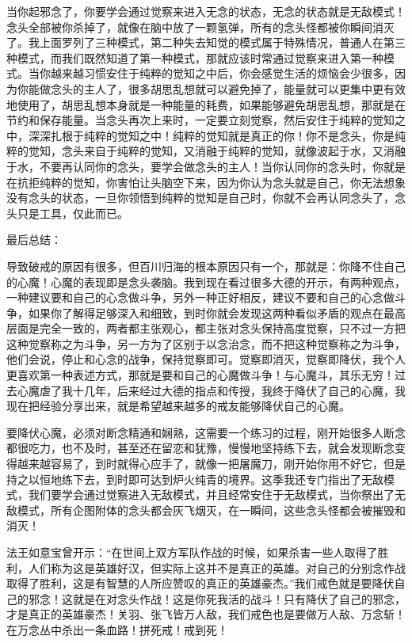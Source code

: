 当你起邪念了，你要学会通过觉察来进入无念的状态，无念的状态就是无敌模式！念头全部被你杀掉了，就像在脑中放了一颗氢弹，所有的念头怪都被你瞬间消灭了。我上面罗列了三种模式，第二种失去知觉的模式属于特殊情况，普通人在第三种模式，而我们既然知道了第一种模式，那就应该时常通过觉察来进入第一种模式。当你越来越习惯安住于纯粹的觉知之中后，你会感觉生活的烦恼会少很多，因为你能做念头的主人了，很多胡思乱想就可以避免掉了，能量就可以更集中更有效地使用了，胡思乱想本身就是一种能量的耗费，如果能够避免胡思乱想，那就是在节约和保存能量。当念头再次上来时，一定要立刻觉察，然后安住于纯粹的觉知之中，深深扎根于纯粹的觉知之中！纯粹的觉知就是真正的你！你不是念头，你是纯粹的觉知，念头来自于纯粹的觉知，又消融于纯粹的觉知，就像波起于水，又消融于水，不要再认同你的念头，要学会做念头的主人！当你认同你的念头时，你就是在抗拒纯粹的觉知，你害怕让头脑空下来，因为你认为念头就是自己，你无法想象没有念头的状态，一旦你领悟到纯粹的觉知是自己时，你就不会再认同念头了，念头只是工具，仅此而已。

最后总结：

导致破戒的原因有很多，但百川归海的根本原因只有一个，那就是：你降不住自己的心魔！心魔的表现即是念头袭脑。我到现在看过很多大德的开示，有两种观点，一种建议要和自己的心念做斗争，另外一种正好相反，建议不要和自己的心念做斗争，如果你了解得足够深入和细致，到时你就会发现这两种看似矛盾的观点在最高层面是完全一致的，两者都主张观心，都主张对念头保持高度觉察，只不过一方把这种觉察称之为斗争，另一方为了区别于以念治念，而不把这种觉察称之为斗争，他们会说，停止和心念的战争，保持觉察即可。觉察即消灭，觉察即降伏，我个人更喜欢第一种表述方式，那就是要和自己的心魔做斗争！与心魔斗，其乐无穷！过去心魔虐了我十几年，后来经过大德的指点和传授，我终于降伏了自己的心魔，我现在把经验分享出来，就是希望越来越多的戒友能够降伏自己的心魔。

要降伏心魔，必须对断念精通和娴熟，这需要一个练习的过程，刚开始很多人断念都很吃力，也不及时，甚至还在留恋和犹豫，慢慢地坚持练下去，就会发现断念变得越来越容易了，到时就得心应手了，就像一把屠魔刀，刚开始你用不好它，但是持之以恒地练下去，到时即可达到炉火纯青的境界。这季我还专门指出了无敌模式，我们要学会通过觉察进入无敌模式，并且经常安住于无敌模式，当你祭出了无敌模式，所有企图附体的念头都会灰飞烟灭，在一瞬间，这些念头怪都会被摧毁和消灭！

法王如意宝曾开示：“在世间上双方军队作战的时候，如果杀害一些人取得了胜利，人们称为这是英雄好汉，但实际上这并不是真正的英雄。对自己的分别念作战取得了胜利，这是有智慧的人所应赞叹的真正的英雄豪杰。”我们戒色就是要降伏自己的邪念！这就是在对念头作战！这是你死我活的战斗！只有降伏了自己的邪念，才是真正的英雄豪杰！关羽、张飞皆万人敌，我们戒色也是要做万人敌、万念斩！在万念丛中杀出一条血路！拼死戒！戒到死！

